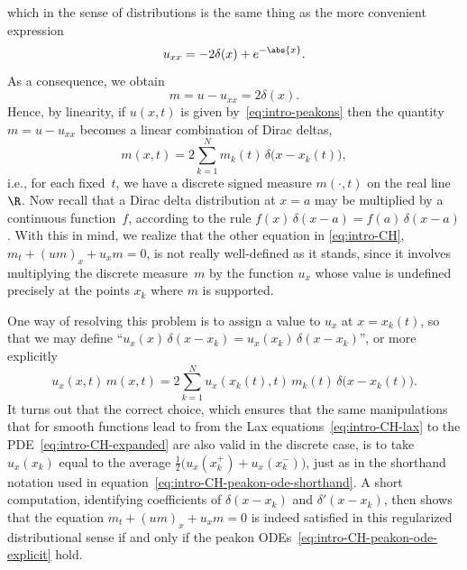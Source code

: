 \documentclass[10pt,a4paper]{article} \pdfoutput=1 
\begin{document}
which in the sense of distributions is the same thing as
the more convenient expression
\begin{equation*}
  u_{xx} = -2 \delta(x) + e^{-\abs{x}}
  .
\end{equation*}
As a consequence, we obtain
\begin{equation*}
  m = u - u_{xx} = 2 \delta(x)
  .
\end{equation*}
Hence, by linearity, if $u(x,t)$ is given by~\eqref{eq:intro-peakons} then the quantity $m = u - u_{xx}$
becomes a linear combination of Dirac deltas,
\begin{equation}
  \label{eq:CH-peakon-m}
  m(x,t) = 2 \sum^N_{k=1} m_k(t) \, \delta \bigl( x-x_k(t) \bigr)
  ,
\end{equation}
i.e., for each fixed~$t$, we have a discrete signed measure $m(\cdot,t)$ on the real line~$\R$.
Now recall that a Dirac delta distribution at $x=a$ may be multiplied by a continuous function~$f$,
according to the rule $f(x) \, \delta(x-a) = f(a) \, \delta(x-a)$.
With this in mind, we realize that the other equation in \eqref{eq:intro-CH},
$m_t + (um)_x + u_x m = 0$,
is not really well-defined as it stands,
since it involves multiplying the discrete measure~$m$
by the function $u_x$ whose value is undefined precisely at the points $x_k$ where $m$ is supported.

One way of resolving this problem is to assign a value to $u_x$ at $x=x_k(t)$, so that
we may define ``$u_x(x) \, \delta(x-x_k) = u_x(x_k) \, \delta(x-x_k)$'',
or more explicitly
\begin{equation*}
  u_x(x,t) \, m(x,t) = 2 \sum^N_{k=1} u_x(x_k(t),t) \, m_k(t) \, \delta \bigl( x-x_k(t) \bigr)
  .
\end{equation*}
It turns out that the correct choice,
which ensures that the same manipulations that for smooth functions
lead to from the Lax equations~\eqref{eq:intro-CH-lax} to the PDE~\eqref{eq:intro-CH-expanded}
are also valid in the discrete case,
is to take $u_x(x_k)$ equal to the average $\tfrac12 \bigl( u_x(x_k^+) + u_x(x_k^-) \bigr)$,
just as in the shorthand notation used in equation~\eqref{eq:intro-CH-peakon-ode-shorthand}.
A short computation, identifying coefficients of $\delta(x-x_k)$ and $\delta'(x-x_k)$,
then shows that the equation $m_t + (um)_x + u_x m = 0$
is indeed satisfied in this regularized distributional sense
if and only if the peakon ODEs~\eqref{eq:intro-CH-peakon-ode-explicit} hold.
\end{document}
